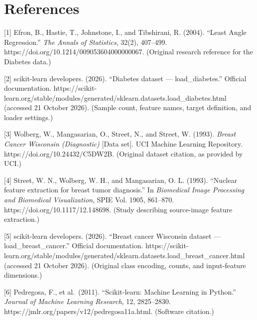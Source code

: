 \documentclass[
  10pt,
]{article}
\begin{document}
\section{References}\label{references}

{[}1{]} Efron, B., Hastie, T., Johnstone, I., and Tibshirani, R. (2004).
``Least Angle Regression.'' \emph{The Annals of Statistics}, 32(2),
407--499. https://doi.org/10.1214/009053604000000067. (Original research
reference for the Diabetes data.)

{[}2{]} scikit-learn developers. (2026). ``Diabetes dataset ---
load\_diabetes.'' Official documentation.
https://scikit-learn.org/stable/modules/generated/sklearn.datasets.load\_diabetes.html
(accessed 21 October 2026). (Sample count, feature names, target
definition, and loader settings.)

{[}3{]} Wolberg, W., Mangasarian, O., Street, N., and Street, W. (1993).
\emph{Breast Cancer Wisconsin (Diagnostic)} {[}Data set{]}. UCI Machine
Learning Repository. https://doi.org/10.24432/C5DW2B. (Original dataset
citation, as provided by UCI.)

{[}4{]} Street, W. N., Wolberg, W. H., and Mangasarian, O. L. (1993).
``Nuclear feature extraction for breast tumor diagnosis.'' In
\emph{Biomedical Image Processing and Biomedical Visualization}, SPIE
Vol. 1905, 861--870. https://doi.org/10.1117/12.148698. (Study
describing source-image feature extraction.)

{[}5{]} scikit-learn developers. (2026). ``Breast cancer Wisconsin
dataset --- load\_breast\_cancer.'' Official documentation.
https://scikit-learn.org/stable/modules/generated/sklearn.datasets.load\_breast\_cancer.html
(accessed 21 October 2026). (Original class encoding, counts, and
input-feature dimensions.)

{[}6{]} Pedregosa, F., et al.~(2011). ``Scikit-learn: Machine Learning
in Python.'' \emph{Journal of Machine Learning Research}, 12,
2825--2830. https://jmlr.org/papers/v12/pedregosa11a.html. (Software
citation.)
\end{document}
